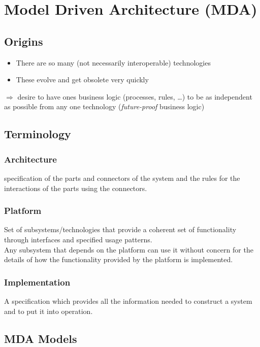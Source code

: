 \chapter{Model Driven Architecture (MDA)}
	\section{Origins}
		\begin{itemize}
			\item There are so many (not necessarily interoperable) technologies
			\item These evolve and get obsolete very quickly
		\end{itemize}
		$ \Longrightarrow $ desire to have ones business logic (processes, rules, \ldots) to be as independent as possible from any one technology (\textit{future-proof} business logic)\Biglb
		
	\section{Terminology}
		\subsection{Architecture}
			specification of the parts and connectors of the system and the rules for the interactions of the parts using the connectors.
			
		\subsection{Platform}
			Set of subsystems/technologies that provide a coherent	set of functionality through interfaces and specified usage	patterns.\\
			Any subsystem that depends on the platform can use it without concern for the details of how the functionality provided by the platform is implemented.
			
		\subsection{Implementation}
			A specification which provides all the	information needed to construct a system and to put it into
			operation.\Biglb
			
			
	\section{MDA Models}
